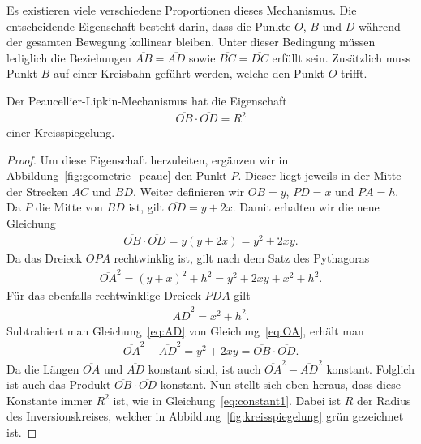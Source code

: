 Es existieren viele verschiedene Proportionen dieses Mechanismus.
Die entscheidende Eigenschaft besteht darin, dass die Punkte $O$, 
$B$ und $D$ während der gesamten Bewegung kollinear bleiben.
Unter dieser Bedingung müssen lediglich die Beziehungen
$\overline{AB} = \overline{AD}$ sowie $\overline{BC} = \overline{DC}$
erfüllt sein.
Zusätzlich muss Punkt $B$ auf einer Kreisbahn geführt werden, 
welche den Punkt $O$ trifft.


\begin{satz}
    Der Peaucellier-Lipkin-Mechanismus hat die Eigenschaft
    \begin{align}
        \overline{OB}\cdot\overline{OD} = R^2
        \label{eq:constant1}
    \end{align}
    einer Kreisspiegelung.
\end{satz}
\begin{proof}
    Um diese Eigenschaft herzuleiten, ergänzen wir in
    Abbildung~\ref{fig:geometrie_peauc} den Punkt $P$.
    Dieser liegt jeweils in der Mitte der Strecken $AC$ und $BD$.
    Weiter definieren wir $\overline{OB}=y$, $\overline{PD}=x$ und
    $\overline{PA}=h$.
    Da $P$ die Mitte von $BD$ ist, gilt
    $\overline{OD}=y+2x$.
    Damit erhalten wir die neue Gleichung
    \begin{align*}
        \overline{OB}\cdot\overline{OD} 
        = 
        y(y+2x)
        =
        y^2+2xy.
    \end{align*}
    Da das Dreieck $OPA$ rechtwinklig ist, gilt nach dem Satz des Pythagoras
    \begin{align}
        \overline{OA}^2
        =
        (y+x)^2+h^2
        =
        y^2+2xy+x^2+h^2.
        \label{eq:OA}
    \end{align}
    Für das ebenfalls rechtwinklige Dreieck $PDA$ gilt
    \begin{align}
        \overline{AD}^2
        =
        x^2+h^2.
        \label{eq:AD}
    \end{align}
    Subtrahiert man Gleichung~\eqref{eq:AD} von Gleichung~\eqref{eq:OA}, erhält man
    \begin{align*}
        \overline{OA}^2-\overline{AD}^2
        =
        y^2+2xy
        =
        \overline{OB}\cdot\overline{OD}.
    \end{align*}
    Da die Längen $\overline{OA}$ und $\overline{AD}$ konstant sind, ist auch
    $\overline{OA}^2-\overline{AD}^2$ konstant.
    Folglich ist auch das Produkt
    $\overline{OB}\cdot\overline{OD}$ konstant.
    Nun stellt sich eben heraus, dass diese Konstante immer $R^2$ ist,
    wie in Gleichung~\eqref{eq:constant1}.
    Dabei ist $R$ der Radius des Inversionskreises, welcher in 
    Abbildung~\ref{fig:kreisspiegelung} grün gezeichnet ist.
\end{proof}

